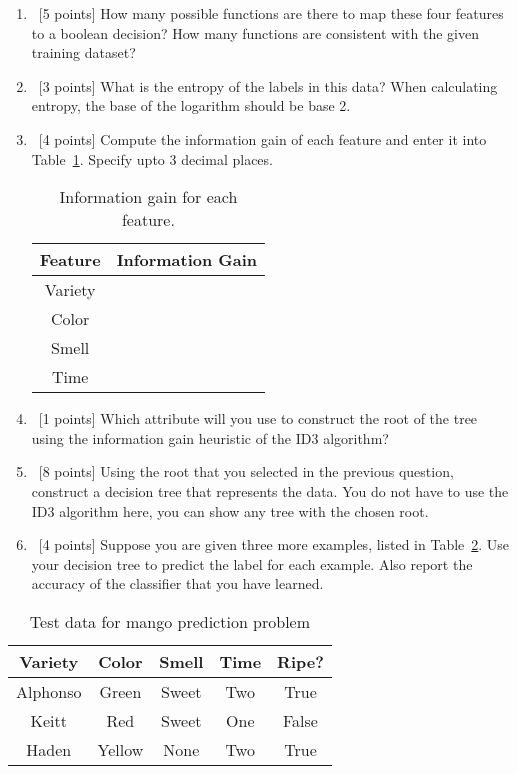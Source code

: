 \begin{enumerate}
  \begin{enumerate}
  \item~[5 points] How many possible functions are there to map these four features to a boolean decision? How many functions are consistent with the given training dataset?
  \item~[3 points] What is the entropy of the labels in this data? When calculating entropy, the base of the logarithm should be base 2.
  \item~[4 points] Compute the information gain of each feature and enter it
    into Table~\ref{tb-entropy-ig}. Specify upto 3 decimal places.
    \begin{table}[h]
      \centering
      \begin{tabular}{c|c}

        \hline
        Feature & Information Gain \\ \hline
        Variety &                  \\
        Color   &                  \\
        Smell   &                  \\
        Time    &                  \\ \hline
      \end{tabular}
      \caption{Information gain for each feature.}
      \label{tb-entropy-ig}
    \end{table}
  \item~[1 points] Which attribute will you use to construct the root of the
    tree using the information gain heuristic of the ID3 algorithm?
  \item~[8 points] Using the root that you selected in the previous question,
    construct a decision tree that represents the data. You do not have to use
    the ID3 algorithm here, you can show any tree with the chosen root.
  \item~[4 points] Suppose you are given three more examples, listed in
    Table~\ref{tb-mango-test}. Use your decision tree to predict the label for
    each example. Also report the accuracy of the classifier that you have
    learned.
  \end{enumerate}

  \begin{table}[h!]
    \centering
    \begin{tabular}{cccc|c}
      \hline
      Variety & Color  & Smell  & Time & Ripe?  \\ \hline
      Alphonso& Green  & Sweet  & Two  & True   \\
      Keitt   & Red    & Sweet  & One  & False  \\
      Haden   & Yellow & None   & Two  & True   \\ \hline
    \end{tabular}
    \caption{Test data for mango prediction problem}\label{tb-mango-test}
  \end{table}


\end{enumerate}
